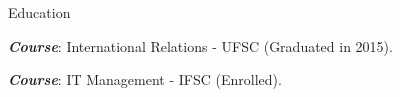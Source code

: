 \begin{rubric}
  {Education}
  {
    
    \entry* \emph{\textbf{Course}}: International Relations - UFSC
    (Graduated in 2015).

    \entry* \emph{\textbf{Course}}: IT Management - IFSC (Enrolled).
    
  }
\end{rubric}

